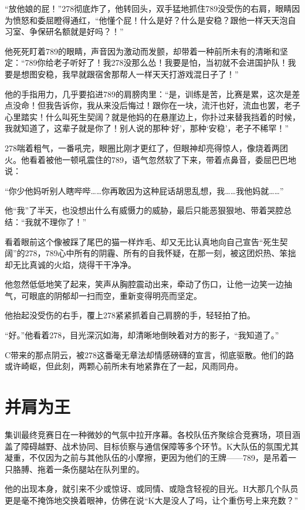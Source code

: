 \documentclass[a4paper]{book}
\begin{document}
“放他娘的屁！”278彻底炸了，他转回头，双手猛地抓住789没受伤的右肩，眼睛因为愤怒和委屈瞪得通红，“他懂个屁！什么是好？什么是安稳？跟他一样天天泡自习室、争保研名额就是好吗？！”

他死死盯着789的眼睛，声音因为激动而发颤，却带着一种前所未有的清晰和坚定：“789你给老子听好了！我278没那么怂！我要是怕，当初就不会进国护队！我要是想图安稳，我早就跟宿舍那帮人一样天天打游戏混日子了！”

他的手指用力，几乎要掐进789的肩膀肉里：“是，训练是苦，比赛是累，这次是差点没命！但我告诉你，我从来没后悔过！跟你在一块，流汗也好，流血也罢，老子心里踏实！什么叫死生契阔？就是他妈的在悬崖边上，你扑过来替我挡着的时候，我就知道了，这辈子就是你了！别人说的那种‘好’，那种‘安稳’，老子不稀罕！”

278喘着粗气，一番吼完，眼圈比刚才更红了，但眼神却亮得惊人，像烧着两团火。他看着被他一顿吼震住的789，语气忽然软了下来，带着点鼻音，委屈巴巴地说：

“你少他妈听别人瞎哔哔……你再敢因为这种屁话胡思乱想，我……我他妈就……”

他“我”了半天，也没想出什么有威慑力的威胁，最后只能恶狠狠地、带着哭腔总结：“我就不理你了！”

看着眼前这个像被踩了尾巴的猫一样炸毛、却又无比认真地向自己宣告“死生契阔”的278，789心中所有的阴霾、所有的自我怀疑，在那一刻，被这团炽热、笨拙却无比真诚的火焰，烧得干干净净。

他忽然低低地笑了起来，笑声从胸腔震动出来，牵动了伤口，让他一边笑一边抽气，可眼底的阴郁却一扫而空，重新变得明亮而坚定。

他抬起没受伤的右手，覆上278紧紧抓着自己肩膀的手，轻轻拍了拍。

“好。”他看着278，目光深沉如海，却清晰地倒映着对方的影子，“我知道了。”

C带来的那点阴云，被278这番毫无章法却情感磅礴的宣言，彻底驱散。他们的路或许崎岖，但此刻，两颗心前所未有地紧靠在了一起，风雨同舟。
\normalsize
\section{并肩为王}
\songti{}
集训最终竞赛日在一种微妙的气氛中拉开序幕。各校队伍齐聚综合竞赛场，项目涵盖了障碍越野、战术协同、目标侦察与通信保障等多个环节。K大队伍的氛围尤其凝重，不仅因为之前与其他队伍的小摩擦，更因为他们的王牌——789，是吊着一只胳膊、拖着一条伤腿站在队列里的。

他的出现本身，就引来不少或惊讶、或同情、或隐含轻视的目光。H大那几个队员更是毫不掩饰地交换着眼神，仿佛在说“K大是没人了吗，让个重伤号上来充数？”
\end{document}
